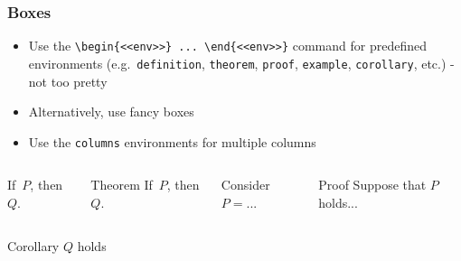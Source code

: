 \documentclass[xcolor=pdftex,t,11pt]{beamer}
\begin{document}
\begin{frame}[fragile]
\frametitle{Boxes}
\begin{itemize}
\item Use the \verb!\begin{<<env>>} ... \end{<<env>>}! command for predefined environments (e.g.\ \verb!definition!, \verb!theorem!, \verb!proof!, \verb!example!, \verb!corollary!, etc.) - not too pretty
\item Alternatively, use fancy boxes
\item Use the \verb!columns! environments for multiple columns
\end{itemize}
\vspace{-5ex}
\begin{columns}
\begin{theorem}
	If\ $P$, then $Q$.
\end{theorem}
\begin{beamerboxesrounded}[upper=uppercol,lower=lowercol,shadow=true]{Theorem}
  If\ $P$, then $Q$.
\end{beamerboxesrounded}
\begin{example}
	Consider $P=...$
\end{example}
\begin{beamerboxesrounded}[upper=uppercol,lower=lowercol,shadow=true]{Proof}
  Suppose that $P$ holds...
\end{beamerboxesrounded}
\end{columns}
\begin{columns}
\column{\textwidth}
\begin{beamerboxesrounded}[upper=uppercol,lower=lowercol,shadow=true]{Corollary}
  $Q$ holds
\end{beamerboxesrounded}
\end{columns}
\end{frame}
\end{document}
